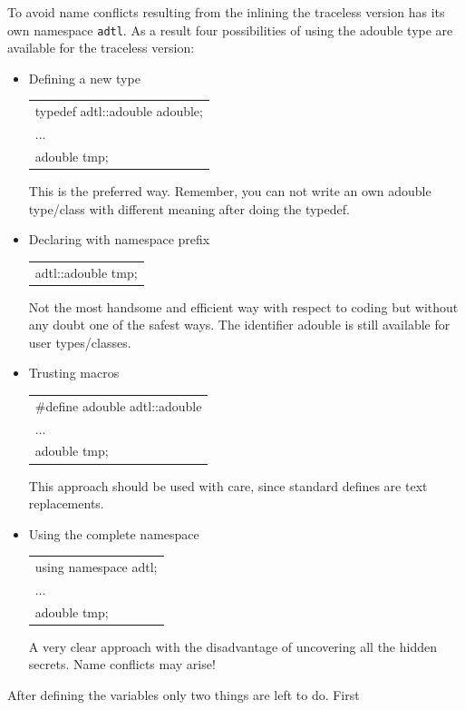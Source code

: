 \documentclass[11pt,twoside]{article}
\begin{document}
To avoid name conflicts
resulting from the inlining the traceless version has its own namespace
\verb#adtl#. As a result four possibilities of using the {\sf adouble}
type are available for the traceless version: 
\begin{itemize}
\item Defining a new type
      \begin{center}
	\begin{tabular}{l}
	  {\sf typedef adtl::adouble adouble;}\\
	  ...\\
	  {\sf adouble tmp;}
	\end{tabular}
      \end{center}
      This is the preferred way. Remember, you can not write an own
      {\sf adouble} type/class with different meaning after doing the typedef.
\item Declaring with namespace prefix
      \begin{center}
	\begin{tabular}{l}
	  {\sf adtl::adouble tmp;}
	\end{tabular}
      \end{center}
      Not the most handsome and efficient way with respect to coding
      but without any doubt one of the safest ways. The identifier
      {\sf adouble} is still available for user types/classes. 
\item Trusting macros
      \begin{center}
	\begin{tabular}{l}
	  {\sf \#define adouble adtl::adouble}\\
	  ...\\
	  {\sf adouble tmp;}
	\end{tabular}
      \end{center}
      This approach should be used with care, since standard defines are text replacements. 
  \item Using the complete namespace
        \begin{center}
	  \begin{tabular}{l}
	    {\sf using namespace adtl;}\\
	    ...\\
	    {\sf adouble tmp;}
	  \end{tabular}
	\end{center}
	A very clear approach with the disadvantage of uncovering all the hidden secrets. Name conflicts may arise!
\end{itemize}
After defining the variables only two things are left to do. First 
\end{document}
